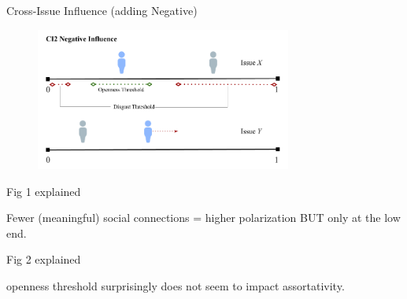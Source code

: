 \documentclass[12pt]{beamer}
\begin{document}
\begin{frame}[c]{Cross-Issue Influence (adding Negative)}  %



\begin{figure}
	\includegraphics[width=0.75\textwidth]{images/CI2Repulsion.png}
\end{figure}

\end{frame}

\begin{frame}[c]{Fig 1 explained}  %

Fewer (meaningful) social connections = higher polarization BUT only at the low
end.

\end{frame}

\begin{frame}[c]{Fig 2 explained}  %


openness threshold surprisingly does not seem to impact assortativity.

\end{frame}
\end{document}
